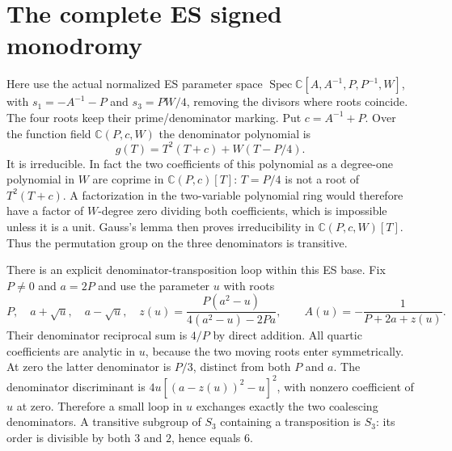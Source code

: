 \documentclass[11pt]{article}
\newcommand{\C}{\mathbb C}
\begin{document}
\section{The complete ES signed monodromy}
Here use the actual normalized ES parameter space
$\operatorname{Spec}\C[A,A^{-1},P,P^{-1},W]$, with
$s_1=-A^{-1}-P$ and $s_3=PW/4$, removing the divisors where roots
coincide. The four roots keep their prime/denominator marking. Put
$c=A^{-1}+P$. Over the function field $\C(P,c,W)$ the denominator
polynomial is
\begin{equation}
 g(T)=T^2(T+c)+W(T-P/4).
 \tag{ECC46}
\end{equation}
It is irreducible. In fact the two coefficients of this polynomial as
a degree-one polynomial in $W$ are coprime in $\C(P,c)[T]$:
$T=P/4$ is not a root of $T^2(T+c)$. A factorization in the two-variable
polynomial ring would therefore have a factor of $W$-degree zero
dividing both coefficients, which is impossible unless it is a unit.
Gauss's lemma then proves irreducibility in $\C(P,c,W)[T]$. Thus the
permutation group on the three denominators is transitive.

There is an explicit denominator-transposition loop within this ES
base. Fix $P\ne0$ and $a=2P$ and use the parameter $u$ with roots
\begin{equation}
 P,\quad a+\sqrt u,\quad a-\sqrt u,\quad
 z(u)=\frac{P(a^2-u)}{4(a^2-u)-2Pa},\qquad
 A(u)=-\frac1{P+2a+z(u)}.
 \tag{ECC47}
\end{equation}
Their denominator reciprocal sum is $4/P$ by direct addition. All
quartic coefficients are analytic in $u$, because the two moving roots
enter symmetrically. At zero the latter denominator is $P/3$, distinct
from both $P$ and $a$. The denominator discriminant is
$4u[(a-z(u))^2-u]^2$, with nonzero coefficient of $u$ at zero. Therefore
a small loop in $u$ exchanges exactly the two coalescing denominators.
A transitive subgroup of $S_3$ containing a transposition is $S_3$:
its order is divisible by both $3$ and $2$, hence equals $6$.
\end{document}

